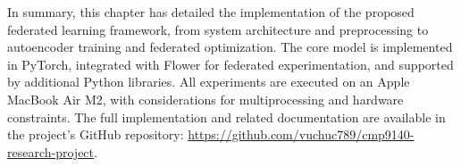 In summary, this chapter has detailed the implementation of the proposed federated learning framework, from system architecture and preprocessing to autoencoder training and federated optimization. The core model is implemented in PyTorch, integrated with Flower for federated experimentation, and supported by additional Python libraries. All experiments are executed on an Apple MacBook Air M2, with considerations for multiprocessing and hardware constraints. The full implementation and related documentation are available in the project’s GitHub repository: \url{https://github.com/vuchuc789/cmp9140-research-project}.
